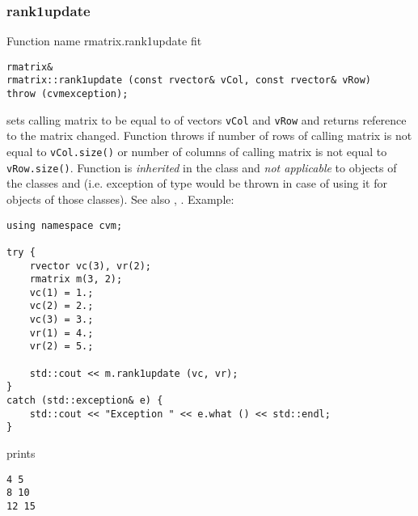 \subsubsection{rank1update}
Function%
\pdfdest name {rmatrix.rank1update} fit
\begin{verbatim}
rmatrix&
rmatrix::rank1update (const rvector& vCol, const rvector& vRow)
throw (cvmexception);
\end{verbatim}
sets  calling matrix to be equal to 
 of vectors
\verb"vCol" and \verb"vRow"
and returns  reference to
the matrix changed.
Function throws  
if  number of rows of  calling matrix
is not equal to \verb"vCol.size()"
or
 number of columns of  calling matrix
is not equal to \verb"vRow.size()".
Function is \emph{inherited} in  the class
 and
\emph{not applicable} to objects of the classes
 and
 (i.e. exception of
type  would be thrown
in case of using it for objects of those classes).
See also ,
.
Example:
\begin{Verbatim}
using namespace cvm;

try {
    rvector vc(3), vr(2);
    rmatrix m(3, 2);
    vc(1) = 1.;
    vc(2) = 2.;
    vc(3) = 3.;
    vr(1) = 4.;
    vr(2) = 5.;

    std::cout << m.rank1update (vc, vr);
}
catch (std::exception& e) {
    std::cout << "Exception " << e.what () << std::endl;
}
\end{Verbatim}
prints
\begin{Verbatim}
4 5
8 10
12 15
\end{Verbatim}
\newpage




